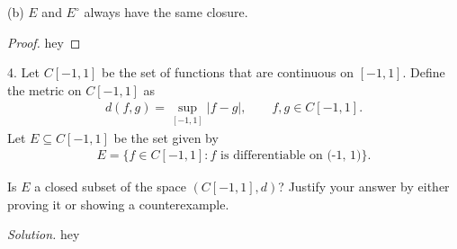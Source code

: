 \documentclass{article}
\begin{document}
(b) $E$ and $E^\circ$ always have the same closure.

\begin{proof}

hey

\end{proof}

\newpage

4. Let $C[-1, 1]$ be the set of functions that are continuous on $[-1,
   1]$. Define the metric on $C[-1, 1]$ as
%
\begin{align*}
    d(f, g) =  \sup_{[-1, 1]} |f - g|,
    \qquad
    f, g \in C[-1, 1].
\end{align*}
%
Let $E \subseteq C[-1, 1]$ be the set given by
%
\begin{align*}
   E = \{f \in C[-1, 1] : \text{$f$ is differentiable on (-1, 1)}\}.
\end{align*}

Is $E$ a closed subset of the space $(C[-1, 1], d)$? Justify your answer
by either proving it or showing a counterexample.

\textit{Solution.}
hey
\end{document}
